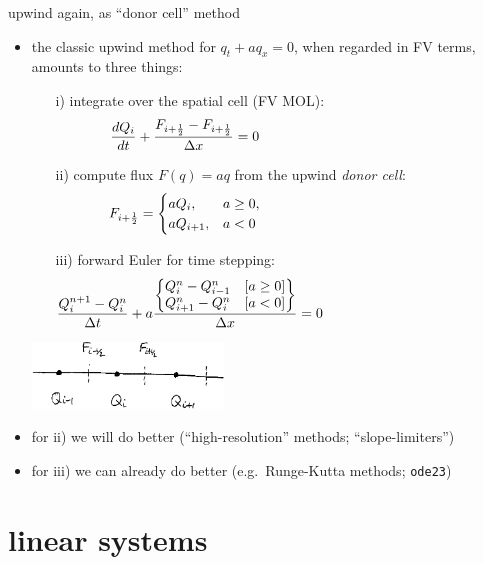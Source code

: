 \documentclass[10pt,hyperref,dvipsnames]{beamer}
\newcommand{\Fiphalf}{{F_{i+\frac{1}{2}}}}
\begin{document}
\begin{frame}{upwind again, as ``donor cell'' method}

\begin{itemize}
\item the classic upwind method for $q_t + a q_x = 0$, when regarded in FV terms, amounts to three things:
    \begin{itemize}
    \item[i)] integrate over the spatial cell (FV MOL):
        $$\frac{dQ_i}{dt} + \frac{\Fiphalf-\Fiphalf}{\Delta x} = 0 \hspace{50mm}$$
    \item[ii)] compute flux $F(q)=aq$ from the upwind \emph{donor cell}:
        $$\Fiphalf = \begin{cases} a Q_{i}, & a \ge 0, \\
                                   a Q_{i+1}, & a < 0 \end{cases} \hspace{50mm}$$
    \item[iii)] forward Euler for time stepping:
        $$\frac{Q_i^{n+1} - Q_i^n}{\Delta t} + a \frac{\begin{Bmatrix} Q^n_{i}-Q^n_{i-1} \quad [a\ge 0] \\ Q^n_{i+1}-Q^n_{i} \quad [a<0] \end{Bmatrix}}{\Delta x} = 0 \hspace{50mm}$$
    \end{itemize}

\vspace{-30mm}

\hfill \includegraphics[width=0.4\textwidth]{figs/cellfluxsketch}

\vspace{12mm}
\item for ii) we will do better (``high-resolution'' methods; ``slope-limiters'')
\item for iii) we can already do better (e.g.~Runge-Kutta methods; \texttt{ode23})
\end{itemize}
\end{frame}


\section{linear systems}
\end{document}
